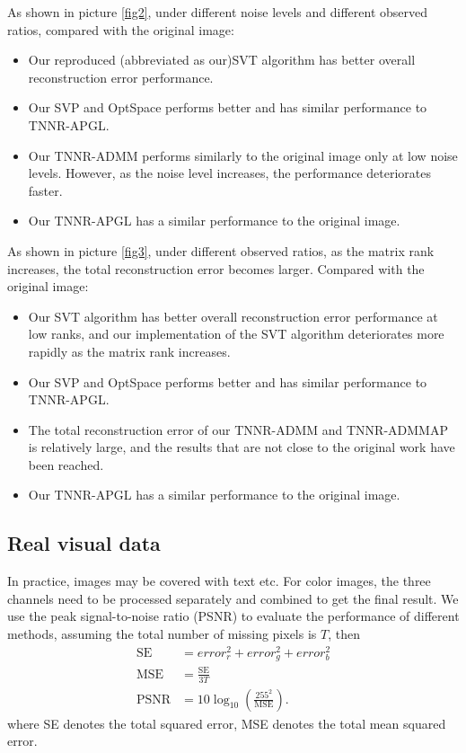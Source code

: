 \documentclass{article}
\begin{document}
{As shown in picture \ref{fig2}, under different noise levels and different observed ratios, compared with the original image:
\begin{itemize}
    \item Our reproduced (abbreviated as our)SVT algorithm has better overall reconstruction error performance.
    
    \item Our SVP and OptSpace performs better and has similar performance to TNNR-APGL.
    
    \item Our TNNR-ADMM performs similarly to the original image only at low noise levels. However, as the noise level increases, the performance deteriorates faster.
    
    \item Our TNNR-APGL has a similar performance to the original image.
\end{itemize}

As shown in picture \ref{fig3}, under different observed ratios, as the
matrix rank increases, the total reconstruction error becomes larger. Compared with the original image:
\begin{itemize}
    \item Our SVT algorithm has better overall reconstruction error performance at low ranks, and our implementation of the SVT algorithm deteriorates more rapidly as the matrix rank increases.
    
    \item Our SVP and OptSpace performs better and has similar performance to TNNR-APGL.
    
    \item The total reconstruction error of our TNNR-ADMM and TNNR-ADMMAP is relatively large, and the results that are not close to the original work have been reached.
    
    \item Our TNNR-APGL has a similar performance to the original image.
\end{itemize}


\subsection{Real visual data}
In practice, images may be covered with text etc. For color images, the three channels need to be processed separately and combined to get the final result. We use the peak signal-to-noise ratio (PSNR) to evaluate the performance of different methods, assuming the total number of missing pixels is $T$, then
\begin{align*}
    \text{SE} & = error_r^2 + error_g^2 + error_b^2 \\
    \text{MSE} & = \frac{\text{SE}}{3T} \\
    \text{PSNR} & = 10\log_{10}(\frac{255^2}{\text{MSE}}).
\end{align*}
where SE denotes the total squared error, MSE denotes the total mean squared error.

}
\end{document}
